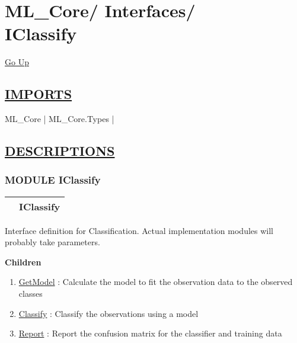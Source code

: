 \chapter*{\color{headfile}
{\large ML\_Core\slash\hspace{0pt}}
{\large Interfaces\slash\hspace{0pt}}
 \\
IClassify
}
\hypertarget{ecldoc:toc:ML_Core.Interfaces.IClassify}{}
\hyperlink{ecldoc:toc:root/ML_Core/Interfaces}{Go Up}

\section*{\underline{\textsf{IMPORTS}}}
\begin{doublespace}
{\large
ML\_Core |
ML\_Core.Types |
}
\end{doublespace}

\section*{\underline{\textsf{DESCRIPTIONS}}}
\subsection*{\textsf{\colorbox{headtoc}{\color{white} MODULE}
IClassify}}

\hypertarget{ecldoc:ML_Core.Interfaces.IClassify}{}

{\renewcommand{\arraystretch}{1.5}
\begin{tabularx}{\textwidth}{|>{\raggedright\arraybackslash}l|X|}
\hline
\hspace{0pt}\mytexttt{\color{red} } & \textbf{IClassify} \\
\hline
\end{tabularx}
}

\par





Interface definition for Classification. Actual implementation modules will probably take parameters.







\textbf{Children}
\begin{enumerate}
\item \hyperlink{ecldoc:ml_core.interfaces.iclassify.getmodel}{GetModel}
: Calculate the model to fit the observation data to the observed classes
\item \hyperlink{ecldoc:ml_core.interfaces.iclassify.classify}{Classify}
: Classify the observations using a model
\item \hyperlink{ecldoc:ml_core.interfaces.iclassify.report}{Report}
: Report the confusion matrix for the classifier and training data
\end{enumerate}

